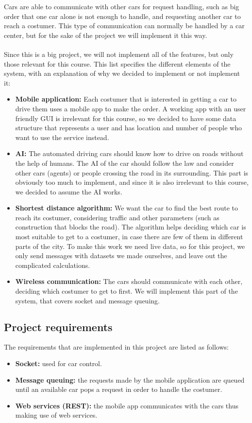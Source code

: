 \documentclass[a4paper]{article}
\begin{document}
Cars are able to communicate with other cars for request handling, such as big order that one car alone is not enough to handle, and requesting another car to reach a costumer. This type of communication can normally be handled by a car center, but for the sake of the project we will implement it this way.
\\\\Since this is a big project, we will not implement all of the features, but only those relevant for this course. This list specifies the different elements of the system, with an explanation of why we decided to implement or not implement it:
\begin{itemize}
    \item \textbf{Mobile application:} Each costumer that is interested in getting a car to drive them uses a mobile app to make the order. A working app with an user friendly GUI is irrelevant for this course, so we decided to have some data structure that represents a user and has location and number of people who want to use the service instead.
    \item \textbf{AI:} The automated driving cars should know how to drive on roads without the help of humans. The AI of the car should follow the law and consider other cars (agents) or people crossing the road in its surrounding. This part is obviously too much to implement, and since it is also irrelevant to this course, we decided to assume the AI works.
    \item \textbf{Shortest distance algorithm:} We want the car to find the best route to reach its costumer, considering traffic and other parameters (such as construction that blocks the road). The algorithm helps deciding which car is most suitable to get to a costumer, in case there are few of them in different parts of the city. To make this work we need live data, so for this project, we only send messages with datasets we made ourselves, and leave out the complicated calculations.
    \item \textbf{Wireless communication:} The cars should communicate with each other, deciding which costumer to get to first. We will implement this part of the system, that covers socket and message queuing.
\end{itemize}

\subsection*{Project requirements}
The requirements that are implemented in this project are listed as follows:
\begin{itemize}
    \item \textbf{Socket:} used for car control.
    \item \textbf{Message queuing:} the requests made by the mobile application are queued until an available car pops a request in order to handle the costumer.
    \item \textbf{Web services (REST):} the mobile app communicates with the cars thus making use of web services.
\end{itemize}
\end{document}
